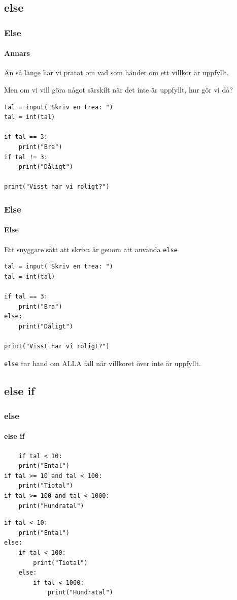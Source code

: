 \documentclass{beamer}
\begin{document}
\subsection{else}

\begin{frame}[fragile]
	\frametitle{Else}
	\framesubtitle{Annars}
	
	Än så länge har vi pratat om vad som händer om ett villkor är uppfyllt.
	
	Men om vi vill göra något särskilt när det inte är uppfyllt, hur gör vi då?
	
	\pause
	
	\begin{lstlisting}
tal = input("Skriv en trea: ")
tal = int(tal)

if tal == 3:
    print("Bra")
if tal != 3:
    print("Dåligt")

print("Visst har vi roligt?")
	\end{lstlisting}
	
\end{frame}

\begin{frame}[fragile]
	\frametitle{Else}
	\framesubtitle{Else}
	
	Ett snyggare sätt att skriva är genom att använda \texttt{else}
	
	\begin{lstlisting}
tal = input("Skriv en trea: ")
tal = int(tal)

if tal == 3:
    print("Bra")
else:
    print("Dåligt")
    
print("Visst har vi roligt?")
	\end{lstlisting}

	\texttt{else} tar hand om ALLA fall när villkoret över inte är uppfyllt.
	
\end{frame}

\subsection{else if}

\begin{frame}[fragile]
	\frametitle{else}
	\framesubtitle{else if}
	
	\begin{lstlisting}
	if tal < 10:
    print("Ental")
if tal >= 10 and tal < 100:
    print("Tiotal")
if tal >= 100 and tal < 1000:
    print("Hundratal")
	\end{lstlisting}
 	\pause
	\begin{lstlisting}
if tal < 10:
    print("Ental")
else:
    if tal < 100:
        print("Tiotal")
    else:
        if tal < 1000:
            print("Hundratal")
	\end{lstlisting}
	

\end{frame}
\end{document}
